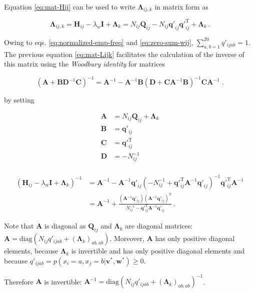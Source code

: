 \documentclass[12pt,a4paper,twoside]{book}
\newcommand{\eq}{\!=\!}
\renewcommand{\H}{\mathbf{H}}
\newcommand{\I}{\mathbf{I}}
\newcommand{\Lijk}{\mathbf{\Lambda}_{ij,k}}
\newcommand{\Lk}{\mathbf{\Lambda}_k}
\newcommand{\Qij}{\mathbf{Q}_{ij}}
\newcommand{\qij}{\mathbf{q\prime}_{ij}}
\renewcommand{\v}{\mathbf{v}}
\newcommand{\w}{\mathbf{w}}
\theoremstyle{definition}
\theoremstyle{definition}
\theoremstyle{remark}
\begin{document}
Equation \eqref{eq:mat-Hij} can be used to write \(\Lijk\) in matrix form
as

\begin{equation}
     \Lijk = \H_{ij} - \lambda_w \I + \Lk = N_{ij} \Qij- N_{ij} \qij \qij^{\mathrm{T}} + \Lk \,.
\label{eq:mat-Lijk}
\end{equation}

Owing to eqs. \eqref{eq:normalized-emp-freq} and \eqref{eq:zero-sum-wij},
\(\sum_{a,b=1}^{20} q'_{ijab} = 1\). The previous equation
\eqref{eq:mat-Lijk} facilitates the calculation of the inverse of this
matrix using the \emph{Woodbury identity} for matrices

\begin{equation}
    (\mathbf{A} + \mathbf{B} \mathbf{D}^{-1} \mathbf{C})^{-1} = \mathbf{A}^{-1} - \mathbf{A}^{-1} \mathbf{B} (\mathbf{D} + \mathbf{C} \mathbf{A}^{-1} \mathbf{B}) ^{-1} \mathbf{C} \mathbf{A}^{-1} \;. 
\end{equation}

by setting

\begin{align}
  \mathbf{A} &= N_{ij} \Qij + \Lk \\
  \mathbf{B} &= \qij \\
  \mathbf{C} &= \qij^\mathrm{T} \\
  \mathbf{D} &=- N_{ij}^{-1} \\
\end{align}

\begin{align}
      \left( \H_{ij} - \lambda_w \I + \Lk \right)^{-1} & = \mathbf{A}^{-1} - \mathbf{A}^{-1} \qij  \left( -N_{ij}^{-1}  + \qij^\mathrm{T} \mathbf{A}^{-1} \qij \right)^{-1}  \qij^\mathrm{T} \mathbf{A}^{-1} \\
     & = \mathbf{A}^{-1} + \frac{ (\mathbf{A}^{-1} \qij) (\mathbf{A}^{-1} \qij)^{\mathrm{T}} }{ N_{ij}^{-1} - \qij^\mathrm{T} \mathbf{A}^{-1} \qij} \,.
\label{eq:fast-inverse-mat-Lijk}
\end{align}

Note that \(\mathbf{A}\) is diagonal as \(\Qij\) and \(\Lk\) are
diagonal matrices:
\(\mathbf{A} = \text{diag}(N_{ij} q'_{ijab} + (\Lk)_{ab,ab})\).
Moreover, \(\mathbf{A}\) has only positive diagonal elements, because
\(\Lk\) is invertible and has only positive diagonal elements and
because \(q'_{ijab} = p(x_i \eq a, x_j \eq b | \v^*,\w^*) \ge 0\).

Therefore \(\mathbf{A}\) is invertible:
\(\mathbf{A}^{-1} = \text{diag}(N_{ij} q'_{ijab} + (\Lk)_{ab,ab} )^{-1}\).
\end{document}
